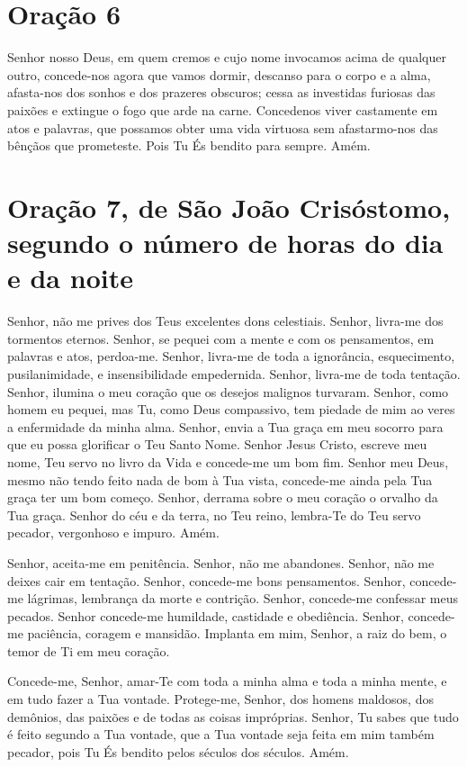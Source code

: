 \documentclass{subfiles}
\begin{document}
\section*{Oração 6}

Senhor nosso Deus, em quem cremos e cujo nome invocamos acima de qualquer outro,
concede-nos agora que vamos dormir, descanso para o corpo e a alma, afasta-nos
dos sonhos e dos prazeres obscuros; cessa as investidas furiosas das paixões e
extingue o fogo que arde na carne. Concedenos viver castamente em atos e
palavras, que possamos obter uma vida virtuosa sem afastarmo-nos das bênçãos que
prometeste. Pois Tu És bendito para sempre. Amém.


\section*{Oração 7, de São João Crisóstomo, segundo o número de horas do dia e da noite}

Senhor, não me prives dos Teus excelentes dons celestiais. Senhor,
livra-me dos tormentos eternos. Senhor, se pequei com a mente e com os
pensamentos, em palavras e atos, perdoa-me. Senhor, livra-me de toda a
ignorância, esquecimento, pusilanimidade, e insensibilidade empedernida.
Senhor, livra-me de toda tentação. Senhor, ilumina o meu coração que os
desejos malignos turvaram. Senhor, como homem eu pequei, mas Tu, como
Deus compassivo, tem piedade de mim ao veres a enfermidade da minha alma.
Senhor, envia a Tua graça em meu socorro para que eu possa glorificar o Teu
Santo Nome. Senhor Jesus Cristo, escreve meu nome, Teu servo no livro da
Vida e concede-me um bom fim. Senhor meu Deus, mesmo não tendo feito
nada de bom à Tua vista, concede-me ainda pela Tua graça ter um bom
começo. Senhor, derrama sobre o meu coração o orvalho da Tua graça. Senhor
do céu e da terra, no Teu reino, lembra-Te do Teu servo pecador, vergonhoso
e impuro. Amém.

Senhor, aceita-me em penitência. Senhor, não me abandones. Senhor,
não me deixes cair em tentação. Senhor, concede-me bons pensamentos.
Senhor, concede-me lágrimas, lembrança da morte e contrição. Senhor,
concede-me confessar meus pecados. Senhor concede-me humildade,
castidade e obediência. Senhor, concede-me paciência, coragem e mansidão.
Implanta em mim, Senhor, a raiz do bem, o temor de Ti em meu coração.

Concede-me, Senhor, amar-Te com toda a minha alma e toda a minha mente,
e em tudo fazer a Tua vontade. Protege-me, Senhor, dos homens maldosos,
dos demônios, das paixões e de todas as coisas impróprias. Senhor, Tu sabes
que tudo é feito segundo a Tua vontade, que a Tua vontade seja feita em mim
também pecador, pois Tu És bendito pelos séculos dos séculos. Amém.
\end{document}
